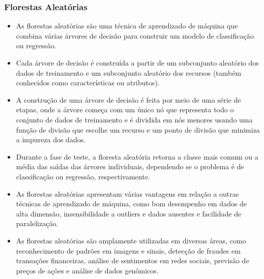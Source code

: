 \documentclass[aspectratio=169]{Beamer} %
\begin{document}
\begin{frame}
    \frametitle{Florestas Aleatórias}
    \begin{itemize}
        \item As florestas aleatórias são uma técnica de aprendizado de máquina que combina várias árvores de decisão para construir um modelo de classificação ou regressão.
        \item Cada árvore de decisão é construída a partir de um subconjunto aleatório dos dados de treinamento e um subconjunto aleatório dos recursos (também conhecidos como características ou atributos).
        \item A construção de uma árvore de decisão é feita por meio de uma série de etapas, onde a árvore começa com um único nó que representa todo o conjunto de dados de treinamento e é dividida em nós menores usando uma função de divisão que escolhe um recurso e um ponto de divisão que minimiza a impureza dos dados.
        \item Durante a fase de teste, a floresta aleatória retorna a classe mais comum ou a média das saídas das árvores individuais, dependendo se o problema é de classificação ou regressão, respectivamente.
        \item As florestas aleatórias apresentam várias vantagens em relação a outras técnicas de aprendizado de máquina, como bom desempenho em dados de alta dimensão, insensibilidade a outliers e dados ausentes e facilidade de paralelização.
        \item As florestas aleatórias são amplamente utilizadas em diversas áreas, como reconhecimento de padrões em imagens e sinais, detecção de fraudes em transações financeiras, análise de sentimentos em redes sociais, previsão de preços de ações e análise de dados genômicos.
    \end{itemize}
\end{frame}
\end{document}
